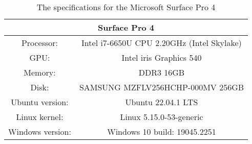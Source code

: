 \begin{table}[H]
    \centering
    \begin{tabular}{|| c | c ||}
    \hline
    \multicolumn{2}{||c||}{Surface Pro 4}           \\ [0.5ex] \hline\hline
    Processor: & Intel i7-6650U CPU 2.20GHz (Intel Skylake) \\
    GPU:       & Intel iris Graphics 540          \\
    Memory:    & DDR3 16GB                         \\
    Disk:      & SAMSUNG MZFLV256HCHP-000MV 256GB   \\
    Ubuntu version:  & Ubuntu 22.04.1 LTS                   \\
    Linux kernel: & Linux 5.15.0-53-generic      \\
    Windows version:& Windows 10 build: 19045.2251 \\ \hline
    \end{tabular}
    \caption{The specifications for the Microsoft Surface Pro 4}
    \label{tab:surfacePro}
\end{table} 
